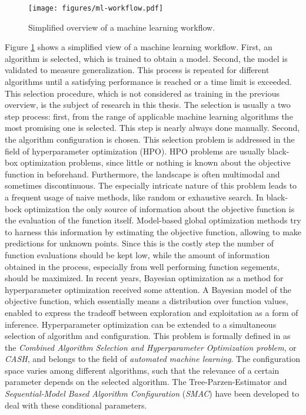 \documentclass[english]{article}
\begin{document}
\begin{figure}[h]
  \centering
  \texttt{[image: figures/ml-workflow.pdf]}
  \caption{Simplified overview of a machine learning workflow.}
  \label{ml-workflow}
\end{figure}

Figure \ref{ml-workflow} shows a simplified view of a machine learning workflow. First, an algorithm is selected, which is trained to obtain a model. Second, the model is validated to measure generalization. This process is repeated for different algorithms until a satisfying performance is reached or a time limit is exceeded. This selection procedure, which is not considered as training in the previous overview, is the subject of research in this thesis. The selection is usually a two step process: first, from the range of applicable machine learning algorithms the most promising one is selected. This step is nearly always done manually. Second, the algorithm configuration is chosen. This selection problem is addressed in the field of hyperparameter optimization (HPO).
HPO problems are usually black-box optimization problems, since little or nothing is known about the objective function in beforehand. Furthermore, the  landscape is often multimodal and sometimes discontinuous. The especially intricate nature of this problem leads to a frequent usage of naive methods, like random or exhaustive search.
In black-bock optimization the only source of information about the objective function is the evaluation of the function itself. Model-based global optimization methods try to harness this information by estimating the objective function, allowing to make predictions for unknown points. Since this is the costly step the number of function evaluations should be kept low, while the amount of information obtained in the process, especially from well performing function segements, should be maximized.
In recent years, Bayesian optimization as a method for hyperparameter optimization received some attention. A Bayesian model of the objective function, which essentially means a distribution over function values, enabled to express the tradeoff between exploration and exploitation as a form of inference.
Hyperparameter optimization can be extended to a simultaneous selection of algorithm and configuration. This problem is formally defined in \cite{feurer_efficient_2015} as the \textit{Combined Algorithm Selection and Hyperparameter Optimization problem}, or \textit{CASH}, and belongs to the field of \textit{automated machine learning}. The configuration space varies among different algorithms, such that the relevance of a certain parameter depends on the selected algorithm. The Tree-Parzen-Estimator and \textit{Sequential-Model Based Algorithm Configuration} (\textit{SMAC}) have been developed to deal with these conditional parameters.
\end{document}
